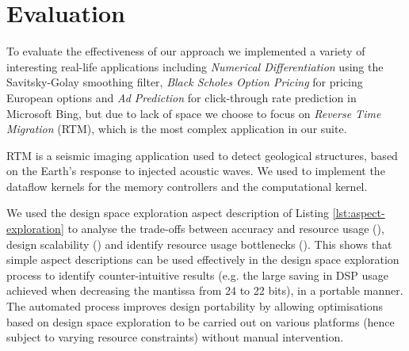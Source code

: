 \section{Evaluation}
\label{sec:evaluation}
\label{sec:benchmark}

To evaluate the effectiveness of our approach we implemented a variety
of interesting real-life applications including \emph{Numerical
  Differentiation} using the Savitsky-Golay smoothing filter,
\emph{Black Scholes Option Pricing} for pricing European options and
\emph{Ad Prediction} for click-through rate prediction in Microsoft
Bing, but due to lack of space we choose to focus on \emph{Reverse
  Time Migration} (RTM), which is the most complex application in our suite.

RTM is a seismic imaging application used to detect geological
structures, based on the Earth's response to injected acoustic
waves. We used \FAST{} to implement the dataflow kernels for the
memory controllers and the computational kernel.

We used the design space exploration aspect description of Listing
\ref{lst:aspect-exploration} to analyse the trade-offs between
accuracy and resource usage (), design scalability
() and identify resource usage bottlenecks
(). This shows that simple aspect descriptions
can be used effectively in the design space exploration process to
identify counter-intuitive results (e.g. the large saving in DSP usage
achieved when decreasing the mantissa from 24 to 22 bits), in a
portable manner. The automated process improves design portability by
allowing optimisations based on design space exploration to be carried
out on various platforms (hence subject to varying resource
constraints) without manual intervention.

